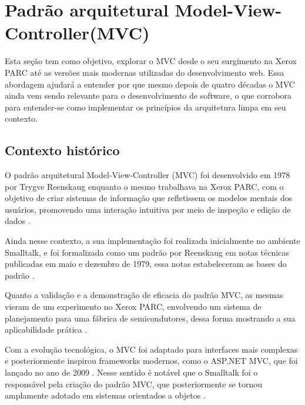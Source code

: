 \section{Padrão arquitetural Model-View-Controller(MVC)}

    \par Esta seção tem como objetivo, explorar o MVC desde o seu surgimento na Xerox PARC até as versões mais modernas utilizadas do desenvolvimento web. Essa abordagem ajudará a entender por que mesmo depois de quatro décadas o MVC ainda vem sendo relevante para o desenvolvimento de software, o que corrobora para entender-se como implementar os princípios da arquitetura limpa em seu contexto.
    
    \subsection{Contexto histórico}
    
        \par O padrão arquitetural Model-View-Controller (MVC) foi desenvolvido em 1978 por Trygve Reenskaug enquanto o mesmo trabalhava na Xerox PARC, com o objetivo de criar sistemas de informação que refletissem os modelos mentais dos usuários, promovendo uma interação intuitiva por meio de inspeção e edição de dados \cite[p.~1]{artigo:reenskaug:2003}. 
        
        \par Ainda nesse contexto, a sua implementação foi realizada inicialmente no ambiente Smalltalk, e foi formalizada como um padrão por Reenskaug em notas técnicas publicadas em maio e dezembro de 1979, essa notas estabeleceram as bases do padrão \cite{artigo:reenskaug:1979}.
        
        \par Quanto a validação e a demonstração de eficacia do padrão MVC, as mesmas vieram de um experimento no Xerox PARC, envolvendo um sistema de planejamento para uma fábrica de semicondutores, dessa forma mostrando a sua aplicabilidade prática \cite{artigo:reenskaug:2003}.
        
        \par Com a evolução tecnológica, o MVC foi adaptado para interfaces mais complexas e posteriormente inspirou frameworks modernos, como o ASP.NET MVC, que foi lançado no ano de 2009 \cite{artigo:deacon:2009}. Nesse sentido é notável  que o Smalltalk foi o responsável pela criação do padrão MVC, que posteriormente se tornou amplamente adotado em sistemas orientados a objetos \cite{artigo:deacon:2009}.
        
